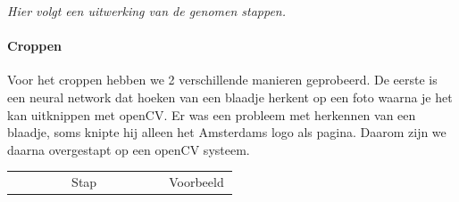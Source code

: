 \documentclass[12pt]{article}
\begin{document}
\textit{Hier volgt een uitwerking van de genomen stappen. }
\paragraph*{Croppen}
\begin{multicols}{2} 
Voor het croppen hebben we 2 verschillende manieren geprobeerd. De eerste is een neural network dat hoeken van een blaadje herkent op een foto waarna je het kan uitknippen met openCV. Er was een probleem met herkennen van een blaadje, soms knipte hij alleen het Amsterdams logo als pagina.
Daarom zijn we daarna overgestapt op een openCV systeem.
\end{multicols}


\def\picwidth{0.3}
\pagebreak
\noindent
\begin{longtable}{@{}p{0.65\linewidth}|p{\picwidth\linewidth}}
\multicolumn{1}{c}{Stap} & \multicolumn{1}{c}{Voorbeeld}
    

\end{longtable}
\end{document}
